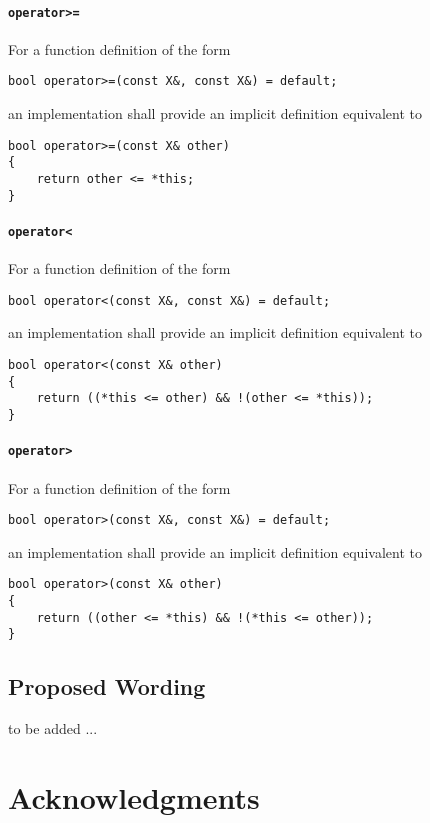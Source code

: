 ﻿\documentclass[a4paper,11pt,final]{article}
\begin{document}
\paragraph{\texttt{operator>=}}
For a function definition of the form
\begin{verbatim}
bool operator>=(const X&, const X&) = default;
\end{verbatim}
an implementation shall provide an implicit definition equivalent to
\begin{verbatim}
bool operator>=(const X& other)
{
    return other <= *this;
}
\end{verbatim}

\paragraph{\texttt{operator<}}
For a function definition of the form
\begin{verbatim}
bool operator<(const X&, const X&) = default;
\end{verbatim}
an implementation shall provide an implicit definition equivalent to
\begin{verbatim}
bool operator<(const X& other)
{
    return ((*this <= other) && !(other <= *this));
}
\end{verbatim}

\paragraph{\texttt{operator>}}
For a function definition of the form
\begin{verbatim}
bool operator>(const X&, const X&) = default;
\end{verbatim}
an implementation shall provide an implicit definition equivalent to
\begin{verbatim}
bool operator>(const X& other)
{
    return ((other <= *this) && !(*this <= other));
}
\end{verbatim}

\subsection{Proposed Wording}
to be added ...

\section{Acknowledgments}



\end{document}
